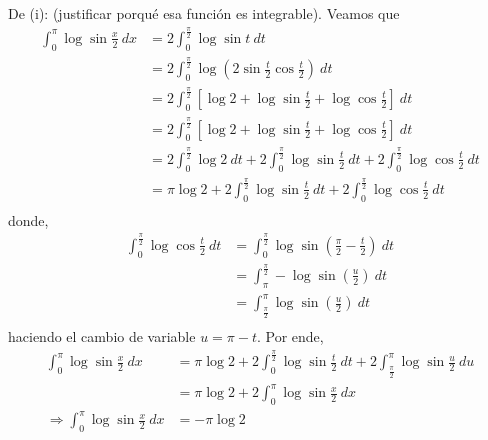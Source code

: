 \documentclass[12pt]{report}
\theoremstyle{largebreak}
\begin{document}
    \begin{sol}
        De (i): (justificar porqué esa función es integrable). Veamos que
        \begin{equation*}
            \begin{split}
                \int_0^\pi\log\sin\frac{x}{2}\:dx&=2\int_0^{\frac{\pi}{2}}\log\sin t\:dt\\
                &=2\int_0^{\frac{\pi}{2}}\log\left(2\sin
                \frac{t}{2}\cos\frac{t}{2}\right) \:dt\\
                &=2\int_0^{\frac{\pi}{2}}\left[\log2+\log\sin\frac{t}{2}+\log\cos\frac{t}{2} \right]  \:dt\\
                &=2\int_0^{\frac{\pi}{2}}\left[\log2+\log\sin\frac{t}{2}+\log\cos\frac{t}{2} \right]  \:dt\\
                &=2\int_0^{\frac{\pi}{2}}\log2\:dt+2\int_0^{\frac{\pi}{2}}\log\sin\frac{t}{2}\:dt+2\int_0^{\frac{\pi}{2}}\log\cos\frac{t}{2}\:dt\\
                &=\pi\log2+2\int_0^{\frac{\pi}{2}}\log\sin\frac{t}{2}\:dt+2\int_0^{\frac{\pi}{2}}\log\cos\frac{t}{2}\:dt\\
            \end{split}
        \end{equation*}
        donde,
        \begin{equation*}
            \begin{split}
                \int_0^{\frac{\pi}{2}}\log\cos\frac{t}{2}\:dt&=\int_0^{\frac{\pi}{2}}\log\sin\left(\frac{\pi}{2}-\frac{t}{2}\right) \:dt\\
                &=\int_{\pi}^{\frac{\pi}{2}}-\log\sin\left(\frac{u}{2}\right) \:dt\\
                &=\int_{\frac{\pi}{2}}^{\pi}\log\sin\left(\frac{u}{2}\right) \:dt\\
            \end{split}
        \end{equation*}
        haciendo el cambio de variable $u=\pi-t$. Por ende,
        \begin{equation*}
            \begin{split}
                \int_0^\pi\log\sin\frac{x}{2}\:dx&=\pi\log2+2\int_0^{\frac{\pi}{2}}\log\sin\frac{t}{2}\:dt+2\int_{\frac{\pi}{2}}^{\pi}\log\sin\frac{u}{2}\:du\\
                &=\pi\log2+2\int_0^{\pi}\log\sin\frac{x}{2}\:dx\\
                \Rightarrow \int_0^\pi\log\sin\frac{x}{2}\:dx&=-\pi\log2\\
            \end{split}
        \end{equation*}
        

\end{sol}
\end{document}

